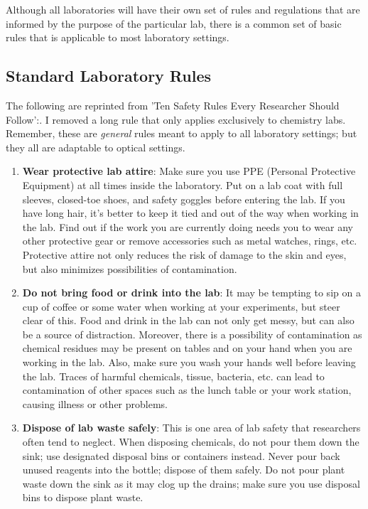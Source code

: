 \documentclass[11pt]{article}
\begin{document}
Although all laboratories will have their own set of rules and regulations that are informed by the purpose of the particular lab, there is a common set of basic rules that is applicable to most laboratory settings.

\subsection{Standard Laboratory Rules}

The following are reprinted from 'Ten Safety Rules Every Researcher Should Follow':\cite{website:Majumder20}. I removed a long rule that only applies exclusively to chemistry labs. Remember, these are \textit{general} rules meant to apply to all laboratory  settings; but they all are adaptable to optical settings.

\begin{enumerate}[noitemsep]
  \item \textbf{Wear protective lab attire}: Make sure you use PPE (Personal Protective Equipment) at all times inside the laboratory. Put on a lab coat with full sleeves, closed-toe shoes, and safety goggles before entering the lab. If you have long hair, it’s better to keep it tied and out of the way when working in the lab. Find out if the work you are currently doing needs you to wear any other protective gear or remove accessories such as metal watches, rings, etc. Protective attire not only reduces the risk of damage to the skin and eyes, but also minimizes possibilities of contamination.
  \item \textbf{Do not bring food or drink into the lab}: It may be tempting to sip on a cup of coffee or some water when working at your experiments, but steer clear of this. Food and drink in the lab can not only get messy, but can also be a source of distraction. Moreover, there is a possibility of contamination as chemical residues may be present on tables and on your hand when you are working in the lab. Also, make sure you wash your hands well before leaving the lab. Traces of harmful chemicals, tissue, bacteria, etc. can lead to contamination of other spaces such as the lunch table or your work station, causing illness or other problems.
  \item \textbf{Dispose of lab waste safely}: This is one area of lab safety that researchers often tend to neglect. When disposing chemicals, do not pour them down the sink; use designated disposal bins or containers instead. Never pour back unused reagents into the bottle; dispose of them safely. Do not pour plant waste down the sink as it may clog up the drains; make sure you use disposal bins to dispose plant waste.

\end{enumerate}
\end{document}
